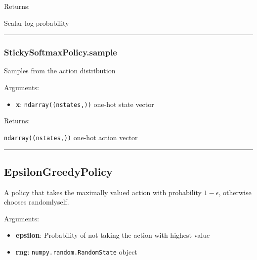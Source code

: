 Returns:

Scalar log-probability

\begin{center}\rule{0.5\linewidth}{\linethickness}\end{center}

\subsubsection{StickySoftmaxPolicy.sample}\label{stickysoftmaxpolicy.sample}

\begin{Shaded}
\begin{Highlighting}[]
\end{Highlighting}
\end{Shaded}

Samples from the action distribution

Arguments:

\begin{itemize}
\tightlist
\item
  \textbf{x}: \texttt{ndarray((nstates,))} one-hot state vector
\end{itemize}

Returns:

\texttt{ndarray((nstates,))} one-hot action vector

\begin{center}\rule{0.5\linewidth}{\linethickness}\end{center}

\subsection{EpsilonGreedyPolicy}\label{epsilongreedypolicy}

\begin{Shaded}
\begin{Highlighting}[]
\end{Highlighting}
\end{Shaded}

A policy that takes the maximally valued action with probability
\(1-\epsilon\), otherwise chooses randomlyself.

Arguments:

\begin{itemize}
\tightlist
\item
  \textbf{epsilon}: Probability of not taking the action with highest
  value
\item
  \textbf{rng}: \texttt{numpy.random.RandomState} object
\end{itemize}

